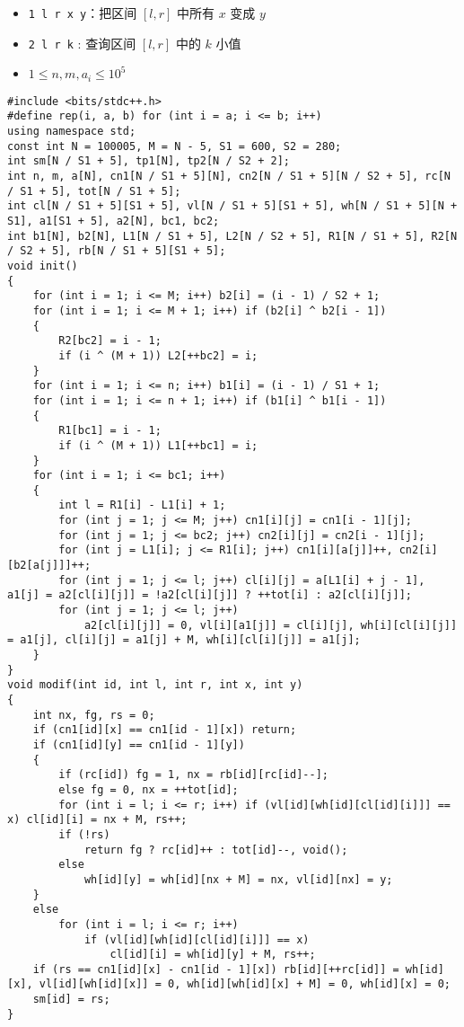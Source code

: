 \documentclass[E:/GsjzTle/main/main.tex]{subfiles}
\begin{document}
\begin{itemize}
\item
  \texttt{1\ l\ r\ x\ y}：把区间 \([l,r]\) 中所有 \(x\) 变成 \(y\)
\item
  \texttt{2\ l\ r\ k} : 查询区间 \([l,r]\) 中的 \(k\) 小值
\item
  \(1\le n,m,a_i \le 10^5\)
\end{itemize}

\begin{lstlisting}
#include <bits/stdc++.h>
#define rep(i, a, b) for (int i = a; i <= b; i++)
using namespace std;
const int N = 100005, M = N - 5, S1 = 600, S2 = 280;
int sm[N / S1 + 5], tp1[N], tp2[N / S2 + 2];
int n, m, a[N], cn1[N / S1 + 5][N], cn2[N / S1 + 5][N / S2 + 5], rc[N / S1 + 5], tot[N / S1 + 5];
int cl[N / S1 + 5][S1 + 5], vl[N / S1 + 5][S1 + 5], wh[N / S1 + 5][N + S1], a1[S1 + 5], a2[N], bc1, bc2;
int b1[N], b2[N], L1[N / S1 + 5], L2[N / S2 + 5], R1[N / S1 + 5], R2[N / S2 + 5], rb[N / S1 + 5][S1 + 5];
void init()
{
	for (int i = 1; i <= M; i++) b2[i] = (i - 1) / S2 + 1;
	for (int i = 1; i <= M + 1; i++) if (b2[i] ^ b2[i - 1])
	{
		R2[bc2] = i - 1;
		if (i ^ (M + 1)) L2[++bc2] = i;
	}
	for (int i = 1; i <= n; i++) b1[i] = (i - 1) / S1 + 1;
	for (int i = 1; i <= n + 1; i++) if (b1[i] ^ b1[i - 1])
	{
		R1[bc1] = i - 1;
		if (i ^ (M + 1)) L1[++bc1] = i;
	}
	for (int i = 1; i <= bc1; i++)
	{
		int l = R1[i] - L1[i] + 1;
		for (int j = 1; j <= M; j++) cn1[i][j] = cn1[i - 1][j];
		for (int j = 1; j <= bc2; j++) cn2[i][j] = cn2[i - 1][j];
		for (int j = L1[i]; j <= R1[i]; j++) cn1[i][a[j]]++, cn2[i][b2[a[j]]]++;
		for (int j = 1; j <= l; j++) cl[i][j] = a[L1[i] + j - 1], a1[j] = a2[cl[i][j]] = !a2[cl[i][j]] ? ++tot[i] : a2[cl[i][j]];
		for (int j = 1; j <= l; j++) 
			a2[cl[i][j]] = 0, vl[i][a1[j]] = cl[i][j], wh[i][cl[i][j]] = a1[j], cl[i][j] = a1[j] + M, wh[i][cl[i][j]] = a1[j];
	}
}
void modif(int id, int l, int r, int x, int y)
{
	int nx, fg, rs = 0;
	if (cn1[id][x] == cn1[id - 1][x]) return;
	if (cn1[id][y] == cn1[id - 1][y])
	{
		if (rc[id]) fg = 1, nx = rb[id][rc[id]--];
		else fg = 0, nx = ++tot[id];
		for (int i = l; i <= r; i++) if (vl[id][wh[id][cl[id][i]]] == x) cl[id][i] = nx + M, rs++;
		if (!rs)
			return fg ? rc[id]++ : tot[id]--, void();
		else
			wh[id][y] = wh[id][nx + M] = nx, vl[id][nx] = y;
	}
	else
		for (int i = l; i <= r; i++)
			if (vl[id][wh[id][cl[id][i]]] == x)
				cl[id][i] = wh[id][y] + M, rs++;
	if (rs == cn1[id][x] - cn1[id - 1][x]) rb[id][++rc[id]] = wh[id][x], vl[id][wh[id][x]] = 0, wh[id][wh[id][x] + M] = 0, wh[id][x] = 0;
	sm[id] = rs;
}

\end{lstlisting}
\end{document}
